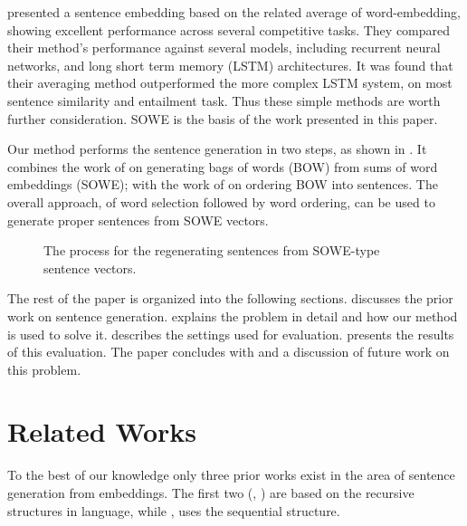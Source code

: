 {\textcite{wieting2015towards} presented a sentence embedding based on the related average of  word-embedding, showing excellent performance across several competitive tasks. They compared their method's performance against several models, including recurrent neural networks, and long short term memory (LSTM) architectures. It was found that their averaging method outperformed the more complex LSTM system, on most sentence similarity and entailment task. Thus these simple methods are worth further consideration. SOWE is the basis of the work presented in this paper.


Our method performs the sentence generation in two steps, as shown in . It combines the work of \textcite{White2015BOWgen} on generating bags of words (BOW) from sums of word embeddings (SOWE); with the work of \textcite{Horvat2014} on ordering BOW into sentences. The overall approach, of word selection followed by word ordering, can be used to generate proper sentences from SOWE vectors.

\begin{figure}
	\centering 
	
	\caption{The \twosteptitle{} process for the regenerating sentences from SOWE-type sentence vectors.}
	\label{block_diagram}
\end{figure}

The rest of the paper is organized into the following sections.  discusses the prior work on sentence  generation.  explains the problem in detail and how our method is used to solve it.  describes the settings used for evaluation.  presents the results of this evaluation. The paper concludes with  and a discussion of future work on this problem.


\section{Related Works}\label{relwork}


To the best of our knowledge only three prior works exist in the area of sentence generation from embeddings. The first two (\textcite{Dinu2014CompositionalGeneration}, \textcite{iyyer2014generating}) are based on the recursive structures in language, while \textcite{Bowman2015SmoothGeneration}, uses the sequential structure.


\renewcommand{\u}{\tilde{u}}

}
